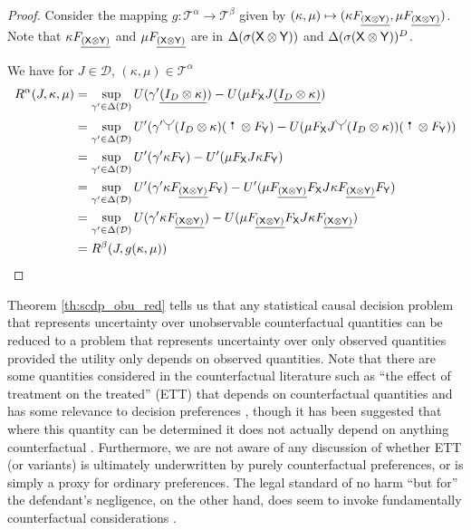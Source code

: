 \begin{proof}
Consider the mapping $g:\mathscr{T}^\alpha\to\mathscr{T}^\beta$ given by $(\kappa,\mu)\mapsto (\kappa F_{\underline{(\mathsf{X}\otimes\mathsf{Y})}},\mu F_{\underline{(\mathsf{X}\otimes\mathsf{Y})}})$. Note that $\kappa F_{\underline{(\mathsf{X}\otimes\mathsf{Y})}}$ and $\mu F_{\underline{(\mathsf{X}\otimes\mathsf{Y})}}$ are in $\Delta(\sigma(\mathsf{X}\otimes\mathsf{Y}))$ and $\Delta(\sigma(\mathsf{X}\otimes\mathsf{Y}))^D$.

We have for $J\in \mathscr{D}$, $(\kappa,\mu)\in\mathscr{T}^\alpha$
\begin{align}
    R^\alpha(J,\kappa,\mu) &= \sup_{\gamma'\in\Delta(\mathcal{D})} U(\gamma'\underline{(I_D\otimes\kappa)}) - U(\mu F_{\RV{X}} J\underline{(I_D\otimes\kappa)})\\
                           &= \sup_{\gamma'\in\Delta(\mathcal{D})} U'(\gamma'\splitter{0.15}(I_D\otimes\kappa)(\stopper{0.15}\otimes F_{\RV{Y}}) - U(\mu F_{\RV{X}} J\splitter{0.15} (I_D\otimes\kappa))(\stopper{0.15}\otimes F_{\RV{Y}}))\\
                           &= \sup_{\gamma'\in\Delta(\mathcal{D})} U'(\gamma'\kappa F_{\RV{Y}}) - U'(\mu F_{\RV{X}} J\kappa F_{\RV{Y}})\\
                           &= \sup_{\gamma'\in\Delta(\mathcal{D})} U'(\gamma'\kappa F_{\underline{(\RV{X}\otimes\RV{Y})}} F_{\RV{Y}}) - U'(\mu F_{\underline{(\RV{X}\otimes\RV{Y})}} F_{\RV{X}} J\kappa F_{\underline{(\RV{X}\otimes\RV{Y})}} F_{\RV{Y}})\\
                           &= \sup_{\gamma'\in\Delta(\mathcal{D})} U(\gamma'\kappa F_{\underline{(\RV{X}\otimes\RV{Y})}}) - U(\mu F_{\underline{(\RV{X}\otimes\RV{Y})}} F_{\RV{X}} J\kappa F_{\underline{(\RV{X}\otimes\RV{Y})}})\\
                           &= R^\beta (J,g(\kappa,\mu))
\end{align}
\end{proof}

Theorem \ref{th:scdp_obu_red} tells us that any statistical causal decision problem that represents uncertainty over unobservable counterfactual quantities can be reduced to a problem that represents uncertainty over only observed quantities provided the utility only depends on observed quantities. Note that there are some quantities considered in the counterfactual literature such as ``the effect of treatment on the treated'' (ETT) that depends on counterfactual quantities and has some relevance to decision preferences \cite{rubin_estimating_1974}, though it has been suggested that where this quantity can be determined it does not actually depend on anything counterfactual \cite{geneletti2007defining}. Furthermore, we are not aware of any discussion of whether ETT (or variants) is ultimately underwritten by purely counterfactual preferences, or is simply a proxy for ordinary preferences. The legal standard of no harm ``but for'' the defendant's negligence, on the other hand, does seem to invoke fundamentally counterfactual considerations \cite{pearl_causality:_2009}.

